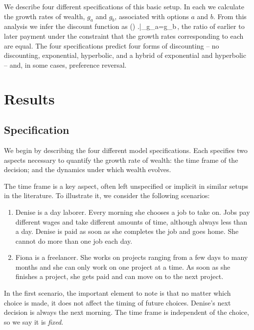 We describe four different specifications of this basic setup. In each we calculate the growth rates of wealth, $g_a$ and $g_b$, associated with options $a$ and $b$. From this analysis we infer the discount function as
%
\be
\delta\left(\del\right) \equiv \left.\right|_{g_a=g_b}\,,
\ee
%
\ie the ratio of earlier to later payment under the constraint that the growth rates corresponding to each are equal. The four specifications predict four forms of discounting -- no discounting, exponential, hyperbolic, and a hybrid of exponential and hyperbolic -- and, in some cases, preference reversal.

\section{Results}\label{sec:results}

\subsection{Specification}

We begin by describing the four different model specifications. Each specifies two aspects necessary to quantify the growth rate of wealth: the time frame of the decision; and the dynamics under which wealth evolves.

The time frame is a key aspect, often left unspecified or implicit in similar setups in the literature. To illustrate it, we consider the following scenarios:
%
\begin{enumerate}
\item Denise is a day laborer. Every morning she chooses a job to take on. Jobs pay different wages and take different amounts of time, although always less than a day. Denise is paid as soon as she completes the job and goes home. She cannot do more than one job each day.
\item Fiona is a freelancer. She works on projects ranging from a few days to many months and she can only work on one project at a time. As soon as she finishes a project, she gets paid and can move on to the next project.
\end{enumerate}

In the first scenario, the important element to note is that no matter which choice is made, it does not affect the timing of future choices. Denise's next decision is always the next morning. The time frame is independent of the choice, so we say it is {\it fixed}.

